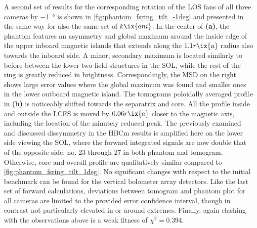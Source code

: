             A second set of results for the corresponding rotation of the LOS fans of all three cameras by $-$\SI{1}{\degree} is shown in \cref{fig:phantom_fsring_tilt_-1deg} and presented in the same way for also the same set of $k\ix{ani}$. In the center of \textbf{(a)}, the phantom features an asymmetry and global maximum around the inside edge of the upper inboard magnetic islands that extends along the $1.1r\ix{a}$ radius also towards the inboard side. A minor, secondary maximum is located similarly to before between the lower two field structures in the SOL, while the rest of the ring is greatly reduced in brightness. Correspondingly, the MSD on the right shows large error values where the global maximum was found and smaller ones in the lower outboard magnetic island. The tomograms poloidally averaged profile in \textbf{(b)} is noticeably shifted towards the separatrix and core. All the profile inside and outside the LCFS is moved by $0.06r\ix{a}$ closer to the magnetic axis, including the location of the minutely reduced peak. The previously examined and discussed dissymmetry in the HBCm results is amplified here on the lower side viewing the SOL, where the forward integrated signals are now double that of the opposite side, no. 23 through 27 in both phantom and tomogram. Otherwise, core and overall profile are qualitatively similar compared to \cref{fig:phantom_fsring_tilt_1deg}. No significant changes with respect to the initial benchmark can be found for the vertical bolometer array detectors. Like the last set of forward calculations, deviations between tomogram and phantom plot for all cameras are limited to the provided error confidence interval, though in contrast not particularly elevated in or around extremes. Finally, again clashing with the observations above is a weak fitness of $\chi^{2}=$\SI{0.394}{\arbitraryunit}.\\%
